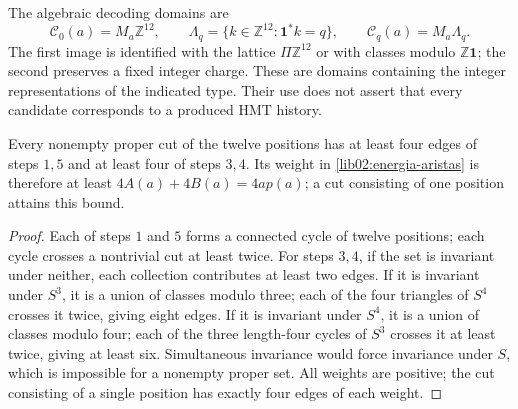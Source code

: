 The algebraic decoding domains are
\[
 \mathcal C_0(a)=M_a\mathbb Z^{12},\qquad
 \Lambda_q=\{k\in\mathbb Z^{12}:\mathbf1^*k=q\},\qquad
 \mathcal C_q(a)=M_a\Lambda_q.
\]
The first image is identified with the lattice \(\Pi\mathbb Z^{12}\) or with classes modulo \(\mathbb Z\mathbf1\); the second preserves a fixed integer charge. These are domains containing the integer representations of the indicated type. Their use does not assert that every candidate corresponds to a produced HMT history.

\begin{lemma}
\label{lib02:cortes}
Every nonempty proper cut of the twelve positions has at least four edges of steps \(1,5\) and at least four of steps \(3,4\). Its weight in \eqref{lib02:energia-aristas} is therefore at least \(4A(a)+4B(a)=4ap(a)\); a cut consisting of one position attains this bound.
\end{lemma}
\begin{proof}
Each of steps \(1\) and \(5\) forms a connected cycle of twelve positions; each cycle crosses a nontrivial cut at least twice. For steps \(3,4\), if the set is invariant under neither, each collection contributes at least two edges. If it is invariant under \(S^3\), it is a union of classes modulo three; each of the four triangles of \(S^4\) crosses it twice, giving eight edges. If it is invariant under \(S^4\), it is a union of classes modulo four; each of the three length-four cycles of \(S^3\) crosses it at least twice, giving at least six. Simultaneous invariance would force invariance under \(S\), which is impossible for a nonempty proper set. All weights are positive; the cut consisting of a single position has exactly four edges of each weight.
\end{proof}

